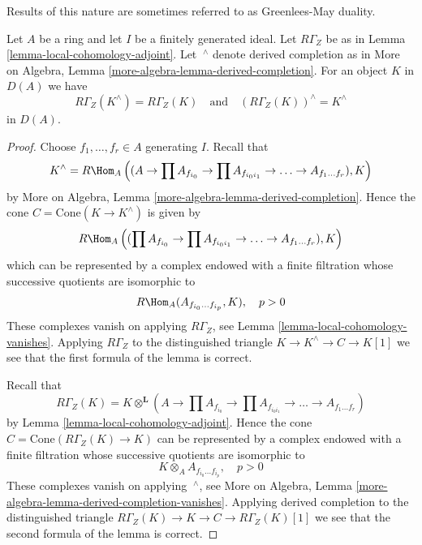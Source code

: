 \begin{lemma}
\label{lemma-complete-and-local}
\begin{slogan}
Results of this nature are sometimes referred to as Greenlees-May duality.
\end{slogan}
Let $A$ be a ring and let $I$ be a finitely generated ideal.
Let $R\Gamma_Z$ be as in Lemma \ref{lemma-local-cohomology-adjoint}.
Let ${\ }^\wedge$ denote derived completion as in
More on Algebra, Lemma \ref{more-algebra-lemma-derived-completion}.
For an object $K$ in $D(A)$ we have
$$
R\Gamma_Z(K^\wedge) = R\Gamma_Z(K)
\quad\text{and}\quad
(R\Gamma_Z(K))^\wedge = K^\wedge
$$
in $D(A)$.
\end{lemma}

\begin{proof}
Choose $f_1, \ldots, f_r \in A$ generating $I$. Recall that
$$
K^\wedge = R\Hom_A\left((A \to \prod A_{f_{i_0}}
\to \prod A_{f_{i_0i_1}} \to \ldots \to A_{f_1 \ldots f_r}), K\right)
$$
by More on Algebra, Lemma \ref{more-algebra-lemma-derived-completion}.
Hence the cone $C = \text{Cone}(K \to K^\wedge)$
is given by
$$
R\Hom_A\left((\prod A_{f_{i_0}}
\to \prod A_{f_{i_0i_1}} \to \ldots \to A_{f_1 \ldots f_r}), K\right)
$$
which can be represented by a complex endowed with a finite filtration
whose successive quotients are isomorphic to
$$
R\Hom_A(A_{f_{i_0} \ldots f_{i_p}}, K), \quad p > 0
$$
These complexes vanish on applying $R\Gamma_Z$, see
Lemma \ref{lemma-local-cohomology-vanishes}. Applying $R\Gamma_Z$
to the distinguished triangle $K \to K^\wedge \to C \to K[1]$
we see that the first formula of the lemma is correct.

\medskip\noindent
Recall that
$$
R\Gamma_Z(K) =
K \otimes^\mathbf{L} (A \to \prod A_{f_{i_0}}
\to \prod A_{f_{i_0i_1}} \to \ldots \to A_{f_1 \ldots f_r})
$$
by Lemma \ref{lemma-local-cohomology-adjoint}.
Hence the cone $C = \text{Cone}(R\Gamma_Z(K) \to K)$
can be represented by a complex endowed with a finite filtration
whose successive quotients are isomorphic to
$$
K \otimes_A A_{f_{i_0} \ldots f_{i_p}}, \quad p > 0
$$
These complexes vanish on applying ${\ }^\wedge$, see
More on Algebra, Lemma \ref{more-algebra-lemma-derived-completion-vanishes}.
Applying derived completion to the distinguished triangle
$R\Gamma_Z(K) \to K \to C \to R\Gamma_Z(K)[1]$
we see that the second formula of the lemma is correct.
\end{proof}